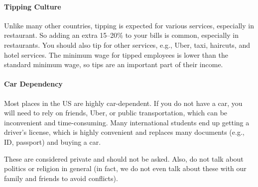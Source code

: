\documentclass[oneside,11pt,dvipsnames]{book}
\begin{document}
  
  \paragraph{Tipping Culture} Unlike many other countries, tipping is expected for various services, especially in restaurant. So adding an extra 15--20\% to your bills is common, especially in restaurants.
  You should also tip for other services, e.g., Uber, taxi, haircuts, and hotel services.  The minimum wage for tipped employees is lower than the standard minimum wage, so tips are an important part of their income.

  \paragraph{Car Dependency} Most places in the US are highly car-dependent. If you do not have a car, you will need to rely on friends, Uber, or public transportation, which can be inconvenient and time-consuming. Many international students end up getting a driver's license, which is highly convenient and replaces many documents (e.g., ID, passport) and buying a car.


  These are considered private and should not be asked.  Also, do not talk about politics or religion in general (in fact, we do not even talk about these with our family and friends to avoid conflicts).  
  
  
  
  
\end{document}

